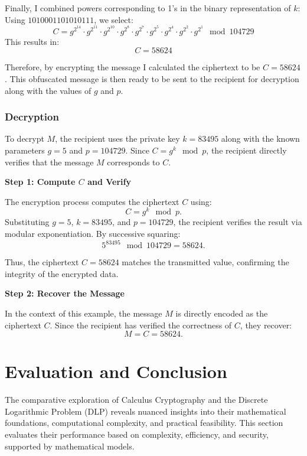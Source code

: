 \documentclass[12pt]{article}
\begin{document}
Finally, I combined powers corresponding to 1's in the binary representation of \( k \):
Using \( 1010001101010111 \), we select:
\[
C = g^{2^{14}} \cdot g^{2^{11}} \cdot g^{2^{10}} \cdot g^{2^8} \cdot g^{2^7} \cdot g^{2^5} \cdot g^{2^4} \cdot g^{2^2} \cdot g^{2^1} \mod 104729
\]
This results in:
\[
C = 58624
\]

\raggedright
\setlength{\parindent}{0.5in} %

Therefore, by encrypting the message I calculated the ciphertext to be \( C = 58624 \). This obfuscated message is then ready to be sent to the recipient for decryption along with the values of \( g \) and \( p \).

\subsubsection*{Decryption}

To decrypt \( M \), the recipient uses the private key \( k = 83495 \) along with the known parameters \( g = 5 \) and \( p = 104729 \). Since \( C = g^k \mod p \), the recipient directly verifies that the message \( M \) corresponds to \( C \).

\textbf{Step 1: Compute \( C \) and Verify}

The encryption process computes the ciphertext \( C \) using:
\[
C = g^k \mod p.
\]
Substituting \( g = 5 \), \( k = 83495 \), and \( p = 104729 \), the recipient verifies the result via modular exponentiation. By successive squaring:
\[
5^{83495} \mod 104729 = 58624.
\]

Thus, the ciphertext \( C = 58624 \) matches the transmitted value, confirming the integrity of the encrypted data.

\textbf{Step 2: Recover the Message}

In the context of this example, the message \( M \) is directly encoded as the ciphertext \( C \). Since the recipient has verified the correctness of \( C \), they recover:
\[
M = C = 58624.
\]








\section*{Evaluation and Conclusion}

The comparative exploration of Calculus Cryptography and the Discrete Logarithmic Problem (DLP) reveals nuanced insights into their mathematical foundations, computational complexity, and practical feasibility. This section evaluates their performance based on complexity, efficiency, and security, supported by mathematical models.
\end{document}

